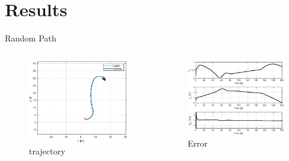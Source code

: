 \documentclass{beamer}
\begin{document}
\section{Results}
\begin{frame}{Random Path}
\begin{columns}
\begin{column}{0.5\textwidth}
\begin{figure}
\includegraphics[scale=0.35]{figs/matlab/gradientDescent/randomPath/trajectoryRandomPath.eps}
\caption{trajectory}
\end{figure}
\end{column}

\begin{column}{0.5\textwidth}
\begin{center}

\begin{figure}
\includegraphics[scale=0.45]{figs/matlab/gradientDescent/randomPath/stateErrorRandomPath.eps}
\caption{Error}
\end{figure}
\end{center}

\end{column}

\end{columns}
\end{frame}
\end{document}

